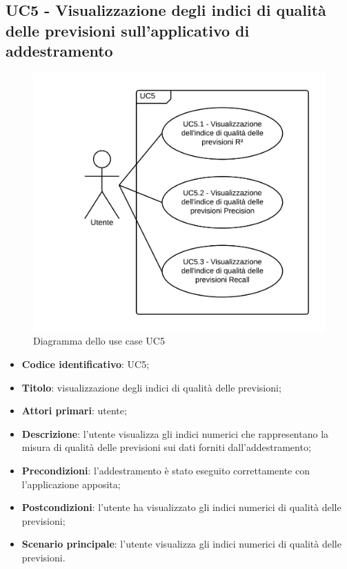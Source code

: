 \subsection{UC5 - Visualizzazione degli indici di qualità delle previsioni sull'applicativo di addestramento}
\begin{figure}[H]
	\includegraphics{img/UC5_-_Visualizzazione_degli_indici_di_qualita_delle_previsioni_sull'applicativo_esterno.png}
	\caption{Diagramma dello use case UC5}
\end{figure}
\begin{itemize}
	\item \textbf{Codice identificativo}: UC5;
	\item \textbf{Titolo}: visualizzazione degli indici di qualità delle previsioni;
	\item \textbf{Attori primari}: utente;
	\item \textbf{Descrizione}: l'utente visualizza gli indici numerici che rappresentano la misura di qualità delle previsioni sui dati forniti dall'addestramento;
	\item \textbf{Precondizioni}: l'addestramento è stato eseguito correttamente con l'applicazione apposita;
	\item \textbf{Postcondizioni}: l'utente ha visualizzato gli indici numerici di qualità delle previsioni;
	\item \textbf{Scenario principale}: l'utente visualizza gli indici numerici di qualità delle previsioni.
\end{itemize} 

